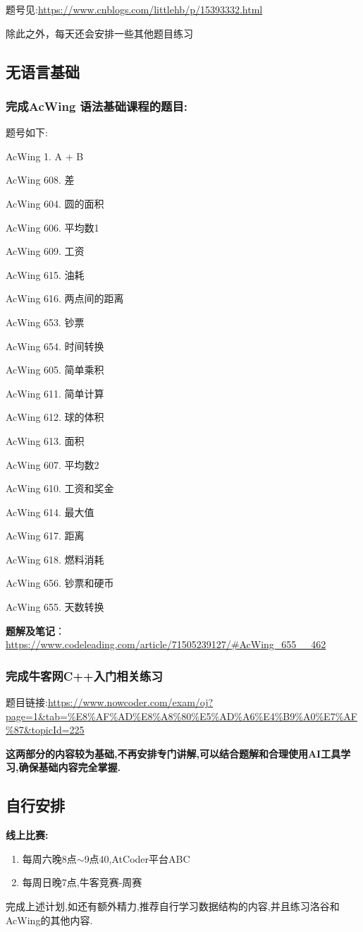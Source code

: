 题号见:\url{https://www.cnblogs.com/littlehb/p/15393332.html}

除此之外，每天还会安排一些其他题目练习



\subsection{无语言基础}


\subsubsection{完成AcWing 语法基础课程的题目:}

题号如下:

{
AcWing 1. A + B

AcWing 608. 差

AcWing 604. 圆的面积

AcWing 606. 平均数1

AcWing 609. 工资

AcWing 615. 油耗

AcWing 616. 两点间的距离

AcWing 653. 钞票

AcWing 654. 时间转换

AcWing 605. 简单乘积

AcWing 611. 简单计算

AcWing 612. 球的体积

AcWing 613. 面积

AcWing 607. 平均数2

AcWing 610. 工资和奖金

AcWing 614. 最大值

AcWing 617. 距离

AcWing 618. 燃料消耗

AcWing 656. 钞票和硬币

AcWing 655. 天数转换

}

\textbf{题解及笔记}：\url{https://www.codeleading.com/article/71505239127/#AcWing_655__462}

\subsubsection{完成牛客网C++入门相关练习}

题目链接:\url{https://www.nowcoder.com/exam/oj?page=1&tab=%E8%AF%AD%E8%A8%80%E5%AD%A6%E4%B9%A0%E7%AF%87&topicId=225}

\textbf{\color{red} 这两部分的内容较为基础,不再安排专门讲解,可以结合题解和合理使用AI工具学习,确保基础内容完全掌握.
}

\subsection{自行安排}

\textbf{线上比赛:}
\begin{enumerate}
	\item 每周六晚8点$\sim$9点40,AtCoder平台ABC
	\item 每周日晚7点,牛客竞赛-周赛
\end{enumerate}



完成上述计划,如还有额外精力,推荐自行学习数据结构的内容,并且练习洛谷和AcWing的其他内容.

